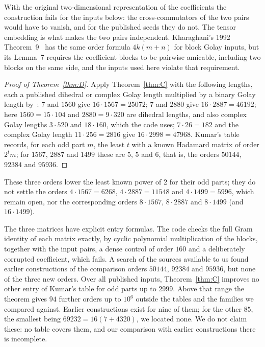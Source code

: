 \documentclass[10pt]{article}
\theoremstyle{remark}
\begin{document}
With the original two-dimensional representation of the coefficients the construction fails for the inputs below: the cross-commutators of the two pairs would have to vanish, and for the published seeds they do not. The tensor embedding is what makes the two pairs independent. Kharaghani's 1992 Theorem~9~\cite{Kh92} has the same order formula $4k(m+n)$ for block Golay inputs, but its Lemma~7 requires the coefficient blocks to be pairwise amicable, including two blocks on the same side, and the inputs used here violate that requirement.

\begin{proof}[Proof of Theorem~\ref{thm:D}]
Apply Theorem~\ref{thm:C} with the following lengths, each a published dihedral or complex Golay length multiplied by a binary Golay length by~\cite[Lemma~3]{KK98}: $7$ and $1560$ give $16\cdot1567=25072$; $7$ and $2880$ give $16\cdot2887=46192$; here $1560=15\cdot104$ and $2880=9\cdot320$ are dihedral lengths, and also complex Golay lengths $3\cdot520$ and $18\cdot160$, which the code uses; $7\cdot26=182$ and the complex Golay length $11\cdot256=2816$ give $16\cdot2998=47968$. Kumar's table~\cite{Ku26} records, for each odd part $m$, the least $t$ with a known Hadamard matrix of order $2^tm$; for $1567$, $2887$ and $1499$ these are $5$, $5$ and $6$, that is, the orders $50144$, $92384$ and $95936$.
\end{proof}

These three orders lower the least known power of $2$ for their odd parts; they do not settle the orders $4\cdot1567=6268$, $4\cdot2887=11548$ and $4\cdot1499=5996$, which remain open, nor the corresponding orders $8\cdot1567$, $8\cdot2887$ and $8\cdot1499$ (and $16\cdot1499$).

The three matrices have explicit entry formulas. The code checks the full Gram identity of each matrix exactly, by cyclic polynomial multiplication of the blocks, together with the input pairs, a dense control of order $160$ and a deliberately corrupted coefficient, which fails. A search of the sources available to us found earlier constructions of the comparison orders $50144$, $92384$ and $95936$, but none of the three new orders. Over all published inputs, Theorem~\ref{thm:C} improves no other entry of Kumar's table for odd parts up to $2999$. Above that range the theorem gives $94$ further orders up to $10^6$ outside the tables and the families we compared against. Earlier constructions exist for nine of them; for the other $85$, the smallest being $69232=16(7+4320)$, we located none. We do not claim these: no table covers them, and our comparison with earlier constructions there is incomplete.
\end{document}
